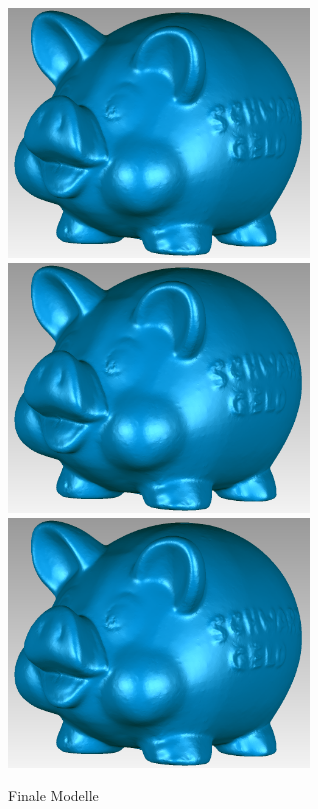 \documentclass[]{article}
\begin{document}
\begin{figure}[p]
\centering
\caption{Finale Modelle}
\includegraphics[width=80mm]{images/sparschwein/final} %
\includegraphics[width=80mm]{images/sparschwein/final} %
\includegraphics[width=80mm]{images/sparschwein/final}
\end{figure}
		
\end{document}
